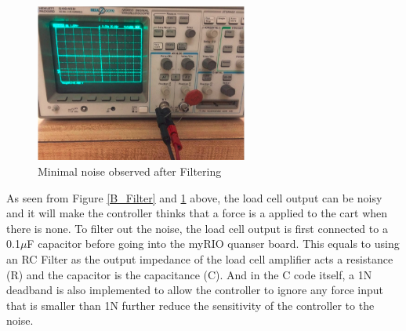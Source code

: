 \begin{figure}[ht]
\begin{center}
\includegraphics[width=2.75in]{Images/After_Filter.PNG}
\caption{Minimal noise observed after Filtering}
\label{A_Filter}
\end{center}
\end{figure}
As seen from Figure \ref{B_Filter} and \ref{A_Filter} above, the load cell output can be noisy and it will make the controller thinks that a force is a applied to the cart when there is none. To filter out the noise, the load cell output is first connected to a 0.1$\mu$F capacitor before going into the myRIO quanser board. This equals to using an RC Filter as the output impedance of the load cell amplifier acts a resistance (R) and the capacitor is the capacitance (C). And in the C code itself, a 1N deadband is also implemented to allow the controller to ignore any force input that is smaller than 1N further reduce the sensitivity of the controller to the noise.
